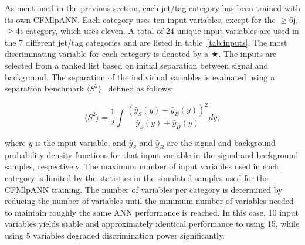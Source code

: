 \par As mentioned in the previous section, each jet/tag category has
been trained with its own CFMlpANN.  Each category uses ten input
variables, except for the $\ge$6j, $\ge$4t category, which uses
eleven.  A total of 24 unique input variables are used in the 7
different jet/tag categories and are listed in
table~\ref{tab:inputs}.  The most discriminating variable for each
category is denoted by a $\bigstar$.  The inputs are selected from a
ranked list based on initial separation between signal and background.
The separation of the individual variables is evaluated using a
separation benchmark $\langle S^2 \rangle$~\cite{Hocker:2007ht}
defined as follows: 

\begin{equation} \langle S^2 \rangle = \frac{1}{2}
 \int{\frac{\left(\hat{y}_S(y) - \hat{y}_B(y)\right)^2}{\hat{y}_S(y) +
 \hat{y}_B(y)} dy}, 
\end{equation} 

\noindent where $y$ is the input variable, and $\hat{y}_S$ and
$\hat{y}_B$ are the signal and background probability density
functions for that input variable in the signal and background
samples, respectively. The maximum number of input variables
used in each category is limited by the statistics in the simulated
samples used for the CFMlpANN training. The number of variables per category is
determined by reducing the number of variables until the minimum
number of variables needed to maintain roughly the same ANN
performance is reached. In this case, 10 input variables yields stable
and approximately identical performance to using 15, while using 5
variables degraded discrimination power significantly.

